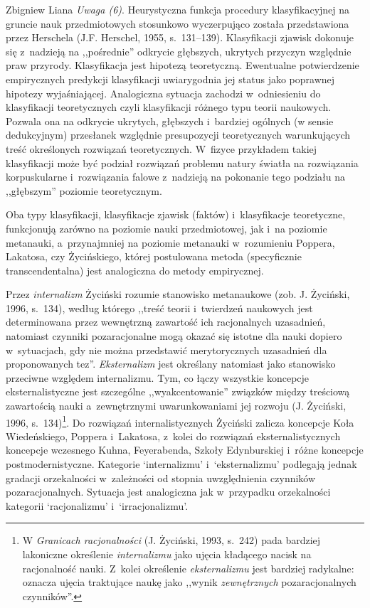 \begin{artplenv}{Zbigniew Liana}
\textit{Uwaga (6)}. Heurystyczna funkcja procedury klasyfikacyjnej na gruncie nauk przedmiotowych stosunkowo wyczerpująco
została przedstawiona przez Herschela \label{ref:RND1u8fbCVzxR}(J.F. Herschel, 1955, s.~131–139). Klasyfikacji zjawisk
dokonuje się z~nadzieją na ,,pośrednie'' odkrycie głębszych, ukrytych przyczyn względnie praw przyrody. Klasyfikacja jest
hipotezą teoretyczną. Ewentualne potwierdzenie empirycznych predykcji klasyfikacji uwiarygodnia jej status jako
poprawnej hipotezy wyjaśniającej. Analogiczna sytuacja zachodzi w~odniesieniu do klasyfikacji teoretycznych czyli
klasyfikacji różnego typu teorii naukowych. Pozwala ona na odkrycie ukrytych, głębszych i~bardziej ogólnych (w sensie
dedukcyjnym) przesłanek względnie presupozycji teoretycznych warunkujących treść określonych rozwiązań
teoretycznych. W~fizyce przykładem takiej klasyfikacji może być podział rozwiązań problemu natury światła na rozwiązania
korpuskularne i~rozwiązania falowe z~nadzieją na pokonanie tego podziału na ,,głębszym'' poziomie teoretycznym.

Oba typy klasyfikacji, klasyfikacje zjawisk (faktów) i~klasyfikacje teoretyczne, funkcjonują zarówno na poziomie nauki
przedmiotowej, jak i~na poziomie metanauki, a~przynajmniej na poziomie metanauki w~rozumieniu Poppera, Lakatosa, czy
Życińskiego, której postulowana metoda (specyficznie transcendentalna) jest analogiczna do metody empirycznej.

Przez \textit{internalizm} Życiński rozumie stanowisko metanaukowe \label{ref:RNDCyQqUrHYuu}(zob. J. Życiński, 1996,
s.~134), według którego ,,treść teorii i~twierdzeń naukowych jest determinowana przez wewnętrzną zawartość ich racjonalnych
uzasadnień, natomiast czynniki pozaracjonalne mogą okazać się istotne dla nauki dopiero w~sytuacjach, gdy nie można
przedstawić merytorycznych uzasadnień dla proponowanych tez''.  \textit{Eksternalizm} jest określany natomiast jako
stanowisko przeciwne względem internalizmu. Tym, co łączy wszystkie koncepcje eksternalistyczne jest szczególne
,,wyakcentowanie'' związków między treściową zawartością nauki a~zewnętrznymi uwarunkowaniami jej rozwoju
\label{ref:RNDuAc97ED1Y1}(J. Życiński, 1996, s.~134)\footnote{W \textit{Granicach racjonalności}
\label{ref:RND1EgQJ3J1nD}(J. Życiński, 1993, s.~242) pada bardziej lakoniczne określenie \textit{internalizmu} jako
ujęcia kładącego nacisk na racjonalność nauki. Z~kolei określenie \textit{eksternalizmu} jest bardziej radykalne: oznacza
ujęcia traktujące naukę jako ,,wynik \textit{zewnętrznych} pozaracjonalnych czynników''.}. Do rozwiązań internalistycznych
Życiński zalicza koncepcje Koła Wiedeńskiego, Poppera i~Lakatosa, z~kolei do rozwiązań eksternalistycznych koncepcje
wczesnego Kuhna, Feyerabenda, Szkoły Edynburskiej i~różne koncepcje postmodernistyczne. Kategorie
`internalizmu' i~`eksternalizmu' podlegają jednak gradacji orzekalności w~zależności od stopnia uwzględnienia czynników
pozaracjonalnych. Sytuacja jest analogiczna jak w~przypadku orzekalności kategorii `racjonalizmu' i~`irracjonalizmu'.


\end{artplenv}
